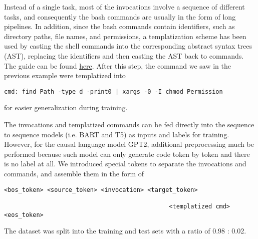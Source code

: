 \documentclass{article}
\begin{document}
Instead of a single task, most of the invocations involve a sequence of
different tasks, and consequently the bash commands are usually in the form of
long pipelines. In addition, since the bash commands contain identifiers, such
as directory paths, file names, and permissions, a templatization scheme has
been used by casting the shell commands into the corresponding abstract syntax
trees (AST), replacing the identifiers and then casting the AST back to
commands. The guide can be found
\href{https://github.com/IBM/clai/tree/nlc2cmd}{here}. After this step, the
command we saw in the previous example were templatized into
\begin{verbatim}
cmd: find Path -type d -print0 | xargs -0 -I chmod Permission
\end{verbatim}
for easier generalization during training.

The invocations and templatized commands can be fed directly into the sequence
to sequence models (i.e. BART and T5) as inputs and labels for training.
However, for the causal language model GPT2, additional preprocessing much be
performed because such model can only generate code token by token and there is
no label at all. We introduced special tokens to separate the invocations and
commands, and assemble them in the form of

\begin{verbatim}
<bos_token> <source_token> <invocation> <target_token>

                                              <templatized cmd> <eos_token> 
\end{verbatim}

The dataset was split into the training and test sets with a ratio of 0.98 : 0.02.
\end{document}
